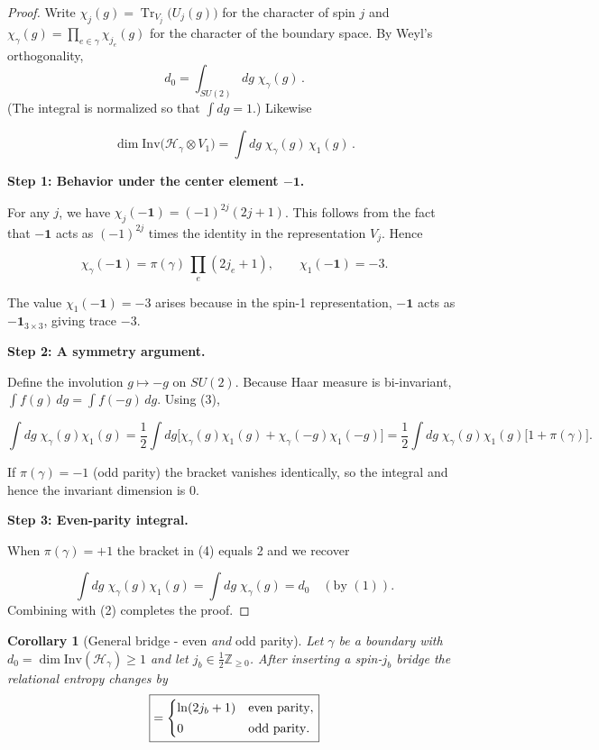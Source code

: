 \documentclass[11pt, a4paper]{article}
\theoremstyle{plain}
\newtheorem{corollary}[theorem]{Corollary}
\theoremstyle{definition}
\theoremstyle{remark}
\newcommand{\Hil}{\mathcal{H}}
\newcommand{\Inv}{\mathrm{Inv}}
\begin{document}
\begin{proof}
  Write $\chi_j(g)=\operatorname{Tr}_{V_j}\!\bigl(U_j(g)\bigr)$ for the
  character of spin $j$ and
  \(
    \chi_{\gamma}(g)=\prod_{e\in\gamma}\chi_{j_e}(g)
  \)
  for the character of the boundary space.
  By Weyl's orthogonality,
  \[  d_0  =\int_{SU(2)}\!dg\;    \chi_{\gamma}(g)\, .\tag{1}\]
  (The integral is normalized so that $\!\int dg=1$.)  Likewise

  \[  \dim\Inv\!\bigl(\Hil_{\gamma}\otimes V_1\bigr)  =\int dg\;\chi_{\gamma}(g)\,\chi_1(g)\, .\tag{2}\]

  \textbf{Step 1: Behavior under the center element $-\mathbf{1}$.}

  For any $j$, we have $\chi_j(-\mathbf{1})=(-1)^{2j}(2j+1)$. This follows from the fact that $-\mathbf{1}$ acts as $(-1)^{2j}$ times the identity in the representation $V_j$. Hence

  \[  \chi_{\gamma}(-\mathbf{1})  =\pi(\gamma)\,    \prod_{e}(2j_e+1),\qquad  \chi_1(-\mathbf{1})=-3.\tag{3}\]

  The value $\chi_1(-\mathbf{1})=-3$ arises because in the spin-1 representation, $-\mathbf{1}$ acts as $-\mathbf{1}_{3\times3}$, giving trace $-3$.

  \textbf{Step 2: A symmetry argument.}

  Define the involution $g\mapsto -g$ on \(SU(2)\).
  Because Haar measure is bi-invariant, \(\int f(g)\,dg=\int f(-g)\,dg\).
  Using (3),

  \[  \int dg\;\chi_{\gamma}(g)\chi_1(g)  =  \frac12  \int dg  \bigl[\chi_{\gamma}(g)\chi_1(g)+\chi_{\gamma}(-g)\chi_1(-g)\bigr]
    =
    \frac12\!\int dg\;
    \chi_{\gamma}(g)\chi_1(g)\bigl[1+\pi(\gamma)\bigr].
    \tag{4}
  \]

  If \(\pi(\gamma)=-1\) (odd parity) the bracket vanishes identically, so
  the integral and hence the invariant dimension is 0.

  \textbf{Step 3: Even-parity integral.}

  When \(\pi(\gamma)=+1\) the bracket in (4) equals 2 and we recover

  \[  \int dg\;\chi_{\gamma}(g)\chi_1(g)  =\int dg\;\chi_{\gamma}(g)  =d_0  \quad(\text{by }(1)).\]
  Combining with (2) completes the proof.
\end{proof}

\begin{corollary}[General bridge - even \textit{and} odd parity]
  \label{cor:general_bridge}
  Let $\gamma$ be a boundary with $d_0=\dim\Inv(\Hil_{\gamma})\ge1$
  and let $j_b\in\frac12\mathbb Z_{\ge0}$.
  After inserting a spin-$j_b$ bridge the relational entropy changes by
  \[  \boxed{%
      =
      \begin{cases}
        \ln(2j_b+1) & \text{even parity},\\[2pt]
        0           & \text{odd parity}.
    \end{cases}}
  \]
\end{corollary}
\end{document}
